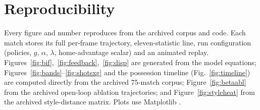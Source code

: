 \documentclass[11pt]{article}
\theoremstyle{definition}
\theoremstyle{remark}
\begin{document}
\section{Reproducibility}\label{app:repro}
Every figure and number reproduces from the archived corpus and code. Each match stores its full per-frame trajectory, eleven-statistic line, run configuration (policies, $g$, $\alpha$, $\lambda$, home-advantage scalar) and an animated replay. Figures~\ref{fig:bif},~\ref{fig:feedback},~\ref{fig:disp} are generated from the model equations; Figures~\ref{fig:bands}--\ref{fig:shotsxg} and the possession timeline (Fig.~\ref{fig:timeline}) are computed directly from the archived $75$-match corpus; Figure~\ref{fig:betaabl} from the archived open-loop ablation trajectories; and Figure~\ref{fig:styleheat} from the archived style-distance matrix. Plots use Matplotlib \citep{hunter2007}.
\end{document}
